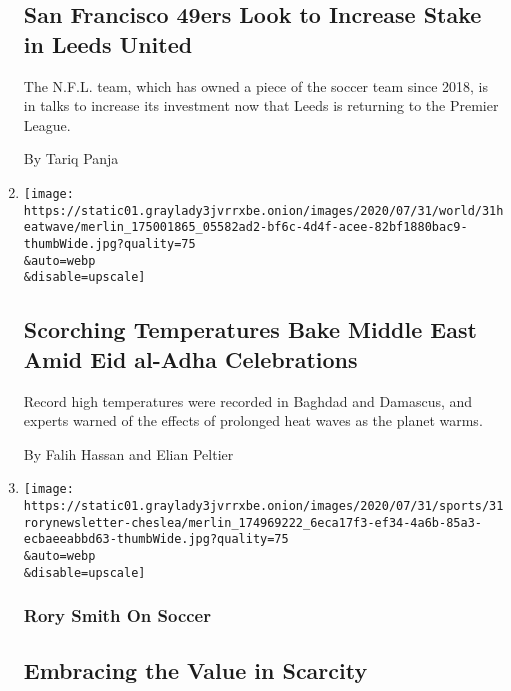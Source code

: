 \begin{enumerate}
  \hypertarget{san-francisco-49ers-look-to-increase-stake-in-leeds-united}{%
  \subsection{San Francisco 49ers Look to Increase Stake in Leeds
  United}\label{san-francisco-49ers-look-to-increase-stake-in-leeds-united}}

  The N.F.L. team, which has owned a piece of the soccer team since
  2018, is in talks to increase its investment now that Leeds is
  returning to the Premier League.

  By Tariq Panja
\item
  \href{/2020/07/31/world/middleeast/Middle-East-heat-wave.html}{}

  \texttt{[image: https://static01.graylady3jvrrxbe.onion/images/2020/07/31/world/31heatwave/merlin\_175001865\_05582ad2-bf6c-4d4f-acee-82bf1880bac9-thumbWide.jpg?quality=75\\\&auto=webp\\\&disable=upscale]}

  \hypertarget{scorching-temperatures-bake-middle-east-amid-eid-al-adha-celebrations}{%
  \subsection{Scorching Temperatures Bake Middle East Amid Eid al-Adha
  Celebrations}\label{scorching-temperatures-bake-middle-east-amid-eid-al-adha-celebrations}}

  Record high temperatures were recorded in Baghdad and Damascus, and
  experts warned of the effects of prolonged heat waves as the planet
  warms.

  By Falih Hassan and Elian Peltier
\item
  \href{/2020/07/31/sports/soccer/soccer-baseball.html}{}

  \texttt{[image: https://static01.graylady3jvrrxbe.onion/images/2020/07/31/sports/31rorynewsletter-cheslea/merlin\_174969222\_6eca17f3-ef34-4a6b-85a3-ecbaeeabbd63-thumbWide.jpg?quality=75\\\&auto=webp\\\&disable=upscale]}

  \hypertarget{rory-smith-on-soccer}{%
  \subsubsection{Rory Smith On Soccer}\label{rory-smith-on-soccer}}

  \hypertarget{embracing-the-value-in-scarcity}{%
  \subsection{Embracing the Value in
  Scarcity}\label{embracing-the-value-in-scarcity}}


\end{enumerate}
